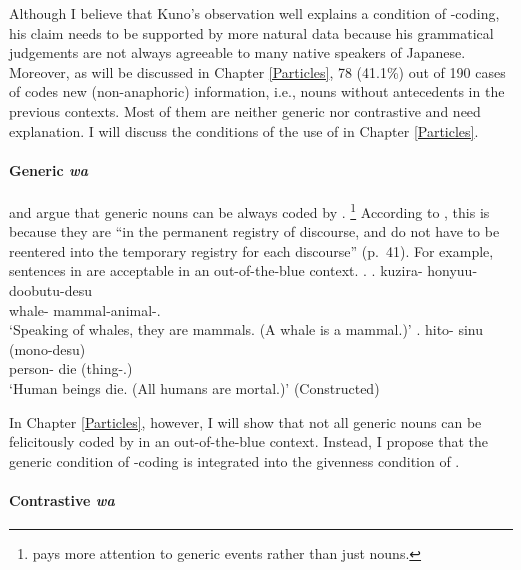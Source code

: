 Although I believe that Kuno's observation well explains
a condition of -coding,
his claim needs to be supported by more natural data
because his grammatical judgements are not always agreeable to many native speakers of Japanese.
Moreover,
as will be discussed in Chapter \ref{Particles},
78 (41.1\%) out of 190 cases of  codes new (non-anaphoric) information, i.e., nouns without antecedents in the previous contexts. 
Most of them are neither generic nor contrastive and need explanation.
I will discuss the conditions of the use of 
in Chapter \ref{Particles}.


\paragraph{Generic \textit{wa}}

 and  argue that
generic nouns can be always coded by .%
 \footnote{
  pays more attention to generic events rather than
 just nouns.
 }
According to ,
this is because they are ``in the permanent registry of discourse,
and do not have to be reentered into the temporary registry for each discourse'' (p.~41).
For example, sentences in \Next are acceptable in an out-of-the-blue context.
%
\ex.
 \ag. kuzira- honyuu-doobutu-desu \\
      whale- mammal-animal-. \\
      `Speaking of whales, they are mammals. (A whale is a mammal.)'
      \hfill{\cite[p.~44]{kuno73}}
 \bg. hito- sinu (mono-desu) \\
      person- die (thing-.)\\
      `Human beings die. (All humans are mortal.)'
      \hfill{(Constructed)}


In Chapter \ref{Particles}, however,
I will show that not all generic nouns can be felicitously coded by  in an out-of-the-blue context.
Instead, I propose that
the generic condition of -coding is integrated into
the givenness condition of .


\paragraph{Contrastive \textit{wa}}

